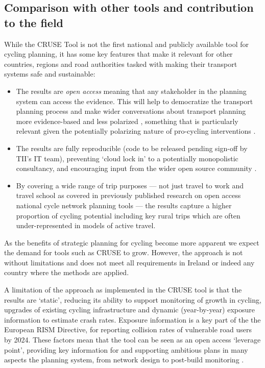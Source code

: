 \documentclass[
  super,
  preprint,
  3p]{elsarticle}
\providecommand{\tightlist}{%
  \setlength{\itemsep}{0pt}\setlength{\parskip}{0pt}}\usepackage{longtable,booktabs,array}
\begin{document}
\hypertarget{comparison-with-other-tools-and-contribution-to-the-field}{%
\subsection{Comparison with other tools and contribution to the
field}\label{comparison-with-other-tools-and-contribution-to-the-field}}

While the CRUSE Tool is not the first national and publicly available
tool for cycling planning, it has some key features that make it
relevant for other countries, regions and road authorities tasked with
making their transport systems safe and sustainable:

\begin{itemize}
\tightlist
\item
  The results are \emph{open access} meaning that any stakeholder in the
  planning system can access the evidence. This will help to democratize
  the transport planning process and make wider conversations about
  transport planning more evidence-based and less polarized
  \citep{lovelace2020}, something that is particularly relevant given
  the potentially polarizing nature of pro-cycling interventions
  \citep{wild2017}.
\item
  The results are fully reproducible (code to be released pending
  sign-off by TII's IT team), preventing `cloud lock in' to a
  potentially monopolistic consultancy, and encouraging input from the
  wider open source community \citep{lovelace2021, dhir2017}.
\item
  By covering a wide range of trip purposes --- not just travel to work
  \citep{lovelace2017, heinen2010} and travel school \citep{goodman2019}
  as covered in previously published research on open access national
  cycle network planning tools --- the results capture a higher
  proportion of cycling potential including key rural trips which are
  often under-represented in models of active travel.
\end{itemize}

As the benefits of strategic planning for cycling become more apparent
\citep{scappini2022} we expect the demand for tools such as CRUSE to
grow. However, the approach is not without limitations and does not meet
all requirements in Ireland or indeed any country where the methods are
applied.

A limitation of the approach as implemented in the CRUSE tool is that
the results are `static', reducing its ability to support monitoring of
growth in cycling, upgrades of existing cycling infrastructure and
dynamic (year-by-year) exposure information to estimate crash rates.
Exposure information is a key part of the the European RISM Directive,
for reporting collision rates of vulnerable road users by 2024. These
factors mean that the tool can be seen as an open access `leverage
point', providing key information for and supporting ambitious plans in
many aspects the planning system, from network design to post-build
monitoring \citep{lovelace2020}.
\end{document}
